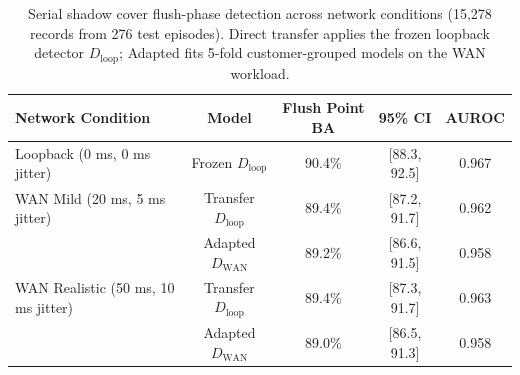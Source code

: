 \begin{table}[t]
\centering
\caption{Serial shadow cover flush-phase detection across network conditions (15,278 records from 276 test episodes). Direct transfer applies the frozen loopback detector $D_{\text{loop}}$; Adapted fits 5-fold customer-grouped models on the WAN workload.}
\label{tab:wan-flush-comparison}
\small
\begin{tabular}{lcccc}
\toprule
\textbf{Network Condition} & \textbf{Model} & \textbf{Flush Point BA} & \textbf{95\% CI} & \textbf{AUROC} \\
\midrule
Loopback (0 ms, 0 ms jitter) & Frozen $D_{\text{loop}}$ & 90.4\% & [88.3, 92.5] & 0.967 \\
\midrule
WAN Mild (20 ms, 5 ms jitter) & Transfer $D_{\text{loop}}$ & 89.4\% & [87.2, 91.7] & 0.962 \\
& Adapted $D_{\text{WAN}}$ & 89.2\% & [86.6, 91.5] & 0.958 \\
\midrule
WAN Realistic (50 ms, 10 ms jitter) & Transfer $D_{\text{loop}}$ & 89.4\% & [87.3, 91.7] & 0.963 \\
& Adapted $D_{\text{WAN}}$ & 89.0\% & [86.5, 91.3] & 0.958 \\
\bottomrule
\end{tabular}
\end{table}